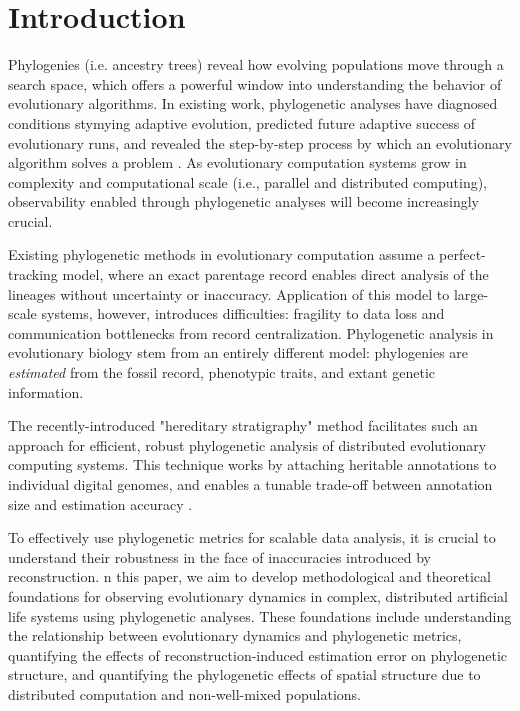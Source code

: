 \section{Introduction}

Phylogenies (i.e. ancestry trees) reveal how evolving populations move through a search space, which offers a powerful window into understanding the behavior of evolutionary algorithms.
In existing work, phylogenetic analyses have diagnosed conditions stymying adaptive evolution, predicted future adaptive success of evolutionary runs, and revealed the step-by-step process by which an evolutionary algorithm solves a problem \citep{hernandezWhatCanPhylogenetic2022a,shahbandeganUntanglingPhylogeneticDiversity2022a,lalejiniEvolutionaryOriginsPhenotypic2016}.
As evolutionary computation systems grow in complexity and computational scale  (i.e., parallel and distributed computing), observability enabled through phylogenetic analyses will become increasingly crucial.

Existing phylogenetic methods in evolutionary computation assume a perfect-tracking model, where an exact parentage record enables direct analysis of the lineages without uncertainty or inaccuracy.
Application of this model to large-scale systems, however, introduces difficulties: fragility to data loss and communication bottlenecks from record centralization.
Phylogenetic analysis in evolutionary biology stem from an entirely different model: phylogenies are \textit{estimated} from the fossil record, phenotypic traits, and extant genetic information.

The recently-introduced "hereditary stratigraphy" method facilitates such an approach for efficient, robust phylogenetic analysis of distributed evolutionary computing systems.
This technique works by attaching heritable annotations to individual digital genomes, and enables a tunable trade-off between annotation size and estimation accuracy \citep{moreno2022hstrat}.

To effectively use phylogenetic metrics for scalable data analysis, it is crucial to understand their robustness in the face of inaccuracies introduced by reconstruction.
n this paper, we aim to develop methodological and theoretical foundations for observing evolutionary dynamics in complex, distributed artificial life systems using phylogenetic analyses. These foundations include understanding the relationship between evolutionary dynamics and phylogenetic metrics, quantifying the effects of reconstruction-induced estimation error on phylogenetic structure, and quantifying the phylogenetic effects of spatial structure due to distributed computation and non-well-mixed populations.
